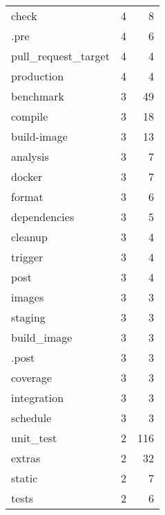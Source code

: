 \begin{tabular}{lrr}
check                      &                   4 &             8 \\
.pre                       &                   4 &             6 \\
pull\_request\_target        &                   4 &             4 \\
production                 &                   4 &             4 \\
benchmark                  &                   3 &            49 \\
compile                    &                   3 &            18 \\
build-image                &                   3 &            13 \\
analysis                   &                   3 &             7 \\
docker                     &                   3 &             7 \\
format                     &                   3 &             6 \\
dependencies               &                   3 &             5 \\
cleanup                    &                   3 &             4 \\
trigger                    &                   3 &             4 \\
post                       &                   3 &             4 \\
images                     &                   3 &             3 \\
staging                    &                   3 &             3 \\
build\_image                &                   3 &             3 \\
.post                      &                   3 &             3 \\
coverage                   &                   3 &             3 \\
integration                &                   3 &             3 \\
schedule                   &                   3 &             3 \\
unit\_test                  &                   2 &           116 \\
extras                     &                   2 &            32 \\
static                     &                   2 &             7 \\
tests                      &                   2 &             6 \\

\end{tabular}
